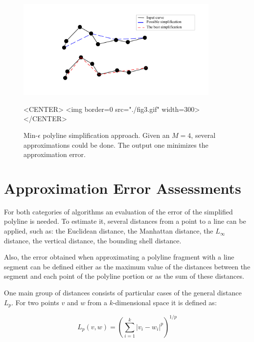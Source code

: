 \begin{description}
\begin{figure}[h]
\begin{ccTexOnly}
\begin{center}
\includegraphics[width=10cm]{Polygonal_approximation_d/fig3} 
\end{center}
\end{ccTexOnly}
\caption{Min-$\epsilon$ polyline simplification approach.
              Given an $M=4$, several approximations could be done. 
                           The output one minimizes the approximation error.
\label{Simplification_Fig_min_eps}}
\begin{ccHtmlOnly}
<CENTER>
<img border=0 src="./fig3.gif" width=300>
</CENTER>
\end{ccHtmlOnly}
\end{figure}



\end{description}


\section{Approximation Error Assessments}

For both categories of algorithms an evaluation of the error
of the simplified polyline is needed. To estimate it,
several distances from a point to a line can be applied, such as: the
Euclidean distance, the Manhattan distance, the $L_\infty$ distance, the
vertical distance, the bounding shell distance.

Also, the error obtained when approximating a polyline fragment with a
line segment can be defined either as the maximum value of the
distances between the segment and each point of the polyline portion or
as the sum of these distances.

One main group of distances consists of particular cases of the
general distance $L_p$. For two points $v$ and $w$ from a $k$-dimensional space
it is defined as:

$$ L_p(v,w) = (\sum_{i=1}^k{| v_i - w_i|^p})^{1/p} $$

